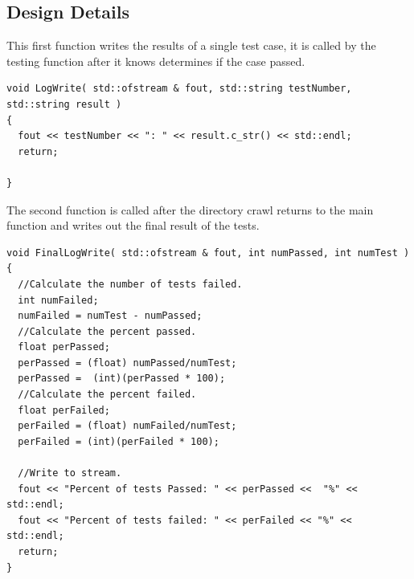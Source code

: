 \subsection{Design Details}
This first function writes the results of a single test case, it is called by the testing function after it knows determines if the case
passed.
\begin{lstlisting}
void LogWrite( std::ofstream & fout, std::string testNumber, std::string result )
{
  fout << testNumber << ": " << result.c_str() << std::endl;
  return;
  
}
\end{lstlisting}
The second function is called after the directory crawl returns to the main function and writes out the final result of the tests.
\begin{lstlisting}
void FinalLogWrite( std::ofstream & fout, int numPassed, int numTest )
{
  //Calculate the number of tests failed.
  int numFailed;
  numFailed = numTest - numPassed;
  //Calculate the percent passed.
  float perPassed;
  perPassed = (float) numPassed/numTest;
  perPassed =  (int)(perPassed * 100);
  //Calculate the percent failed.
  float perFailed;
  perFailed = (float) numFailed/numTest;
  perFailed = (int)(perFailed * 100);
 
  //Write to stream.
  fout << "Percent of tests Passed: " << perPassed <<  "%" << std::endl;
  fout << "Percent of tests failed: " << perFailed << "%" << std::endl;
  return;
}
\end{lstlisting}


